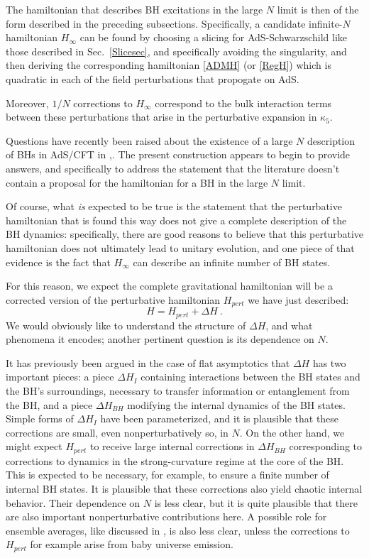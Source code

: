 \documentclass[11pt]{article}
\numberwithin{equation}{section}
\newcommand{\beq}{\begin{equation}}
\newcommand{\eeq}{\end{equation}}
\begin{document}
The hamiltonian that describes BH excitations in the large $N$ limit is then of the form described in the preceding subsections.  Specifically, a candidate infinite-$N$ hamiltonian $H_\infty$ can be found by choosing a slicing for AdS-Schwarzschild like those described in Sec.~\ref{Slicesec}, and specifically avoiding the singularity, and then deriving the corresponding  hamiltonian \eqref{ADMH} (or \eqref{RegH}) which is quadratic in each of the field perturbations that propogate on AdS.  

Moreover, $1/N$ corrections to $H_\infty$ correspond to the bulk interaction terms between these perturbations that arise in the perturbative expansion in $\kappa_5$. 

Questions have recently been raised about the existence of a large $N$ description of BHs in AdS/CFT in \cite{WittQFT,Wittcross},\cite{ScWi}.  The present construction appears to begin to provide answers, and specifically to address the statement\cite{ScWi} that the literature doesn't contain a proposal for the hamiltonian for a BH in the large $N$ limit.

Of course, what {\it is} expected to be true is the statement that the perturbative hamiltonian that is found this way does not give a complete description of the BH dynamics:  specifically, there are good reasons to believe that this perturbative hamiltonian does not ultimately lead to unitary evolution, and one piece of that evidence is the fact that $H_\infty$ can describe an infinite number of BH states.  

For this reason, we expect the complete gravitational hamiltonian will be a corrected version of the perturbative hamiltonian $H_{pert}$ we have just described:
\beq
H = H_{pert} + \Delta H\ .
\eeq
We would obviously like to understand the structure of $\Delta H$, and what phenomena it encodes; another pertinent question is its dependence on $N$.

It has previously been argued\cite{NVNL,NVNLT,NVU,BHQU} in the case of flat asymptotics that $\Delta H$ has two important pieces: a piece $\Delta H_I$ containing interactions between the BH states and the BH's surroundings, necessary to transfer information or entanglement from the BH, and a piece $\Delta H_{BH}$ modifying the internal dynamics of the BH states.  Simple forms of $\Delta H_I$ have been parameterized\cite{NVU}, and it is plausible that these corrections are small, even nonperturbatively so, in $N$.  On the other hand, we might expect $H_{pert}$ to receive large internal corrections in $\Delta H_{BH}$  corresponding to corrections to dynamics in the strong-curvature regime at the core of the BH.  
This is expected to be necessary, for example, to ensure a finite number of internal BH states.
It is plausible that these corrections also yield chaotic internal behavior.  Their dependence on $N$ is less clear, but it is quite plausible that there are also important nonperturbative contributions here.  A possible role for ensemble averages, like discussed in \cite{ScWi}, is also less clear, unless the corrections to $H_{pert}$ for example arise from baby universe emission\cite{Cole,GiSt,MaMa,GiTu,SGthm,HTY}.
\end{document}

